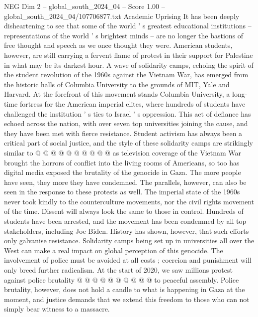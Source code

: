 \begin{textsample}{NEG Dim 2 – global\_south\_2024\_04 – Score 1.00 – global\_south\_2024\_04/107706877.txt}  \label{ex:f2_neg_294}
Academic Uprising It has been deeply disheartening to see that some of the world ' s greatest educational institutions -- representations of the world ' s brightest minds -- are no longer the bastions of free thought and speech as we once thought they were.
American students, however, are still carrying a fervent flame of protest in their support for Palestine in what may be its darkest hour.
A wave of solidarity camps, echoing the spirit of the student revolution of the 1960s against the Vietnam War, has emerged from the historic halls of Columbia University to the grounds of MIT, Yale and Harvard.
At the forefront of this movement stands Columbia University, a long-time fortress for the American imperial elites, where hundreds of students have challenged the institution ' s ties to Israel ' s oppression.
This act of defiance has echoed across the nation, with over seven top universities joining the cause, and they have been met with fierce resistance.
Student activism has always been a critical part of social justice, and the style of these solidarity camps are strikingly similar to @ @ @ @ @ @ @ @ @ @ as television coverage of the Vietnam War brought the horrors of conflict into the living rooms of Americans, so too has digital media exposed the brutality of the genocide in Gaza.
The more people have seen, they more they have condemned.
The parallels, however, can also be seen in the response to these protests as well.
The imperial state of the 1960s never took kindly to the counterculture movements, nor the civil rights movement of the time.
Dissent will always look the same to those in control.
Hundreds of students have been arrested, and the movement has been condemned by all top stakeholders, including Joe Biden.
History has shown, however, that such efforts only galvanise resistance.
Solidarity camps being set up in universities all over the West can make a real impact on global perception of this genocide.
The involvement of police must be avoided at all costs ; coercion and punishment will only breed further radicalism.
At the start of 2020, we saw millions protest against police brutality @ @ @ @ @ @ @ @ @ @ to peaceful assembly.
Police brutality, however, does not hold a candle to what is happening in Gaza at the moment, and justice demands that we extend this freedom to those who can not simply bear witness to a massacre.

\end{textsample}
